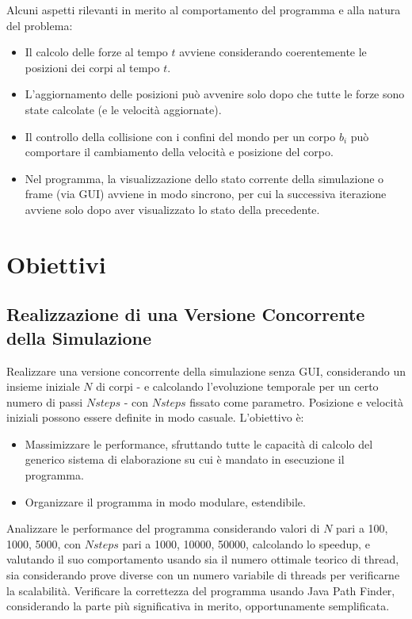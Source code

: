 \documentclass[12pt,a4paper,openright,twoside]{book}
\begin{document}
Alcuni aspetti rilevanti in merito al comportamento del programma e alla natura del problema:
\begin{itemize}
	\item Il calcolo delle forze al tempo $t$ avviene considerando coerentemente le posizioni dei corpi al tempo $t$. 
	\item L'aggiornamento delle posizioni può avvenire solo dopo che tutte le forze sono state calcolate (e le velocità aggiornate).
	\item Il controllo della collisione con i confini del mondo per un corpo $b_{i}$ può comportare il cambiamento della velocità e posizione del corpo.
	\item Nel programma, la visualizzazione dello stato corrente della simulazione o frame (via GUI) avviene in modo sincrono, per cui la successiva iterazione avviene solo dopo aver visualizzato lo stato della precedente.
\end{itemize}

\section{Obiettivi}
\subsection{Realizzazione di una Versione Concorrente della Simulazione}
Realizzare una versione concorrente della simulazione senza GUI, considerando un insieme iniziale $N$ di corpi
- e calcolando l'evoluzione temporale per un certo numero di passi $Nsteps$ -
con $Nsteps$ fissato come parametro. Posizione e velocità iniziali possono essere definite in modo casuale.
L'obiettivo è:
\begin{itemize}
	\item Massimizzare le performance, sfruttando tutte le capacità di calcolo del generico
	sistema di elaborazione su cui è mandato in esecuzione il programma.
	\item Organizzare il programma in modo modulare, estendibile.
\end{itemize}

Analizzare le performance del programma considerando valori di $N$ pari a 100, 1000, 5000, con $Nsteps$ pari a 1000, 10000, 50000,
calcolando lo speedup, e valutando il suo comportamento usando sia il numero ottimale teorico di thread,
sia considerando prove diverse con un numero variabile di threads per verificarne la scalabilità.
Verificare la correttezza del programma usando Java Path Finder, considerando la parte più significativa in merito, opportunamente semplificata.
\end{document}
